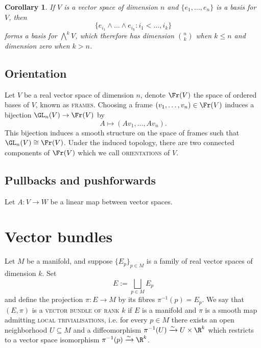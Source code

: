 \documentclass[reqno]{amsart}
\newtheorem{corollary}[theorem]{Corollary}
\theoremstyle{definition}
\theoremstyle{remark}
\renewcommand{\emph}{\textsc}
\begin{document}
\begin{corollary}
	If $V$ is a vector space of dimension $n$ and $\{e_1, \dots, e_n\}$ is a basis for $V$, then 
	\[ \{ e_{i_1} \wedge \dots \wedge e_{i_k} : i_1 < \dots, i_k \} \]
forms a basis for $\bigwedge^k V$, which therefore has dimension $\binom{n}{k}$ when $k \leq n$ and dimension zero when $k > n$.
\end{corollary}

\subsection{Orientation}

Let $V$ be a real vector space of dimension $n$, denote $\Fr (V)$ the space of ordered bases of $V$, known as \emph{frames}. Choosing a frame $(v_1, \dots, v_n) \in \Fr (V)$ induces a bijection $\GL_n (V) \to \Fr (V)$ by 
	\[ A \mapsto (Av_1, \dots, Av_n). \]
This bijection induces a smooth structure on the space of frames such that $\GL_n (V) \cong \Fr (V)$. Under the induced topology, there are two connected components of $\Fr(V)$ which we call \emph{orientations} of $V$. 

\subsection{Pullbacks and pushforwards}

Let $A: V \to W$ be a linear map between vector spaces. 


\section{Vector bundles}

Let $M$ be a manifold, and suppose $\{ E_p \}_{p \in M}$ is a family of real vector spaces of dimension $k$. Set
	\[ E := \bigsqcup_{p \in M} E_p \]
and define the projection $\pi : E \to M$ by its fibres $\pi^{-1} (p) = E_p$. We say that $(E, \pi)$ is a \emph{vector bundle of rank $k$} if $E$ is a manifold and $\pi$ is a smooth map admitting \emph{local trivialisations}, i.e. for every $p \in M$ there exists an open neighborhood $U \subseteq M$ and a diffeomorphism $\pi^{-1} (U) \xrightarrow{\sim} U \times \R^k$ which restricts to a vector space isomorphism $\pi^{-1} (p) \xrightarrow{\sim} \R^k$. 
\end{document}
